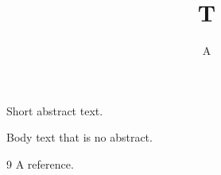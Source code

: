 \documentclass{article}
\begin{document}
\title{T}\author{A}\maketitle
\abstract
Short abstract text.

 Body text that is no abstract.
\begin{thebibliography}{9} A reference.\end{thebibliography}
\end{document}
